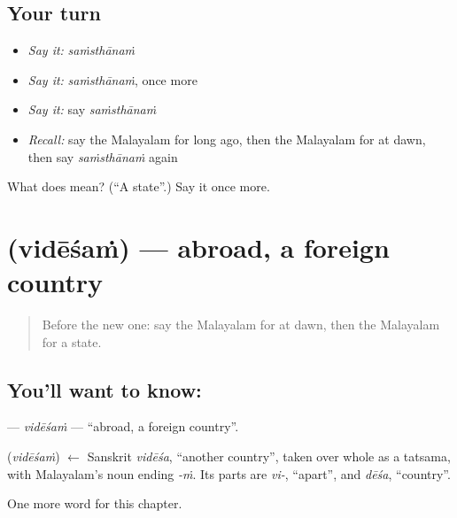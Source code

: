 \subsection*{Your turn}
\begin{itemize}
\raggedright
  \item \emph{Say it:} \emph{saṁsthānaṁ}
  \item \emph{Say it:} \emph{saṁsthānaṁ}, once more
  \item \emph{Say it:} say \emph{saṁsthānaṁ}
  \item \emph{Recall:} say the Malayalam for long ago, then the Malayalam for at dawn, then say \emph{saṁsthānaṁ} again
\end{itemize}

\begin{tcolorbox}[breakable,colback=teal!4,colframe=teal!35!black,title={Before you move on}]
What does  mean? (\textquotedblleft{}A state\textquotedblright{}.) Say it once more.
\end{tcolorbox}
\section[\texorpdfstring{\ml{വിദേശം} (vidēśaṁ)}{വിദേശം (vidēśaṁ)}]{ (vidēśaṁ) — abroad, a foreign country}

\label{lesson:ML-C315-videsam}



\begin{quote}
Before the new one: say the Malayalam for at dawn, then the Malayalam for a state.
\end{quote}

\subsection*{You'll want to know: }
\textbf{} — \emph{vidēśaṁ} — \textquotedblleft{}abroad, a foreign country\textquotedblright{}.

\begin{cousinweb}
\textbf{} (\emph{vidēśaṁ}) $\leftarrow$ Sanskrit \emph{vidēśa}, \textquotedblleft{}another country\textquotedblright{}, taken over whole as a tatsama, with Malayalam's noun ending \emph{-ṁ}. Its parts are \emph{vi-}, \textquotedblleft{}apart\textquotedblright{}, and \emph{dēśa}, \textquotedblleft{}country\textquotedblright{}.
\end{cousinweb}

\begin{grammarlens}[title={What you've built}]
One more word for this chapter.
\end{grammarlens}

